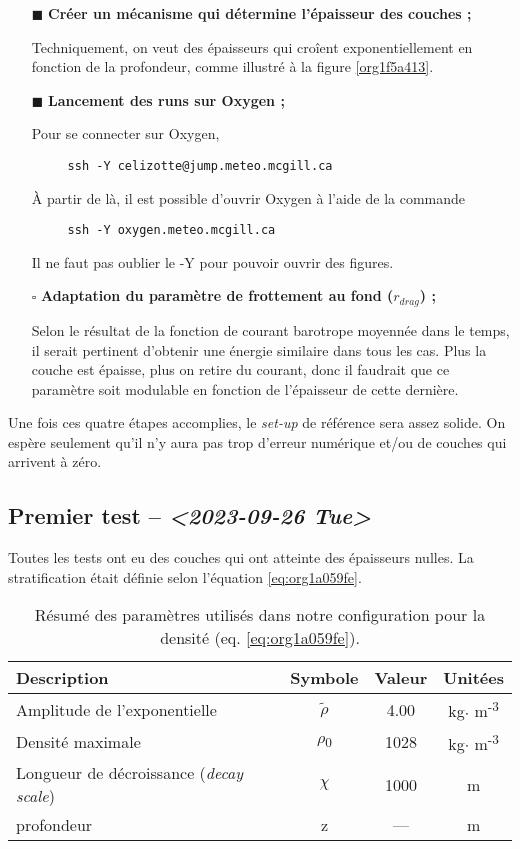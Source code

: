 \documentclass[10pt]{article}
\numberwithin{equation}{section}
\renewcommand{\boxtimes}{\blacksquare}
\begin{document}
\begin{itemize}
\item[{$\boxtimes$}] \textbf{Créer un mécanisme qui détermine l'épaisseur des couches ;}

Techniquement, on veut des épaisseurs qui croîent exponentiellement en fonction de la profondeur, comme illustré à la figure \ref{org1f5a413}.
\end{itemize}


\begin{itemize}
\item[{$\boxtimes$}] \textbf{Lancement des runs sur Oxygen ;}

Pour se connecter sur Oxygen,
\begin{verbatim}
     ssh -Y celizotte@jump.meteo.mcgill.ca
\end{verbatim}
À partir de là, il est possible d'ouvrir Oxygen à l'aide de la commande
\begin{verbatim}
     ssh -Y oxygen.meteo.mcgill.ca
\end{verbatim}
Il ne faut pas oublier le -Y pour pouvoir ouvrir des figures.

\item[{$\square$}] \textbf{Adaptation du paramètre de frottement au fond (\(r_{drag}\)) ;}

Selon le résultat de la fonction de courant barotrope moyennée dans le temps, il serait pertinent d'obtenir une énergie similaire dans tous les cas.
Plus la couche est épaisse, plus on retire du courant, donc il faudrait que ce paramètre soit modulable en fonction de l'épaisseur de cette dernière.
\end{itemize}

Une fois ces quatre étapes accomplies, le \emph{set-up} de référence sera assez solide.
On espère seulement qu'il n'y aura pas trop d'erreur numérique et/ou de couches qui arrivent à zéro.
\subsection{Premier test -- \textit{<2023-09-26 Tue>}}
\label{sec:org741c693}

Toutes les tests ont eu des couches qui ont atteinte des épaisseurs nulles.
La stratification était définie selon l'équation \ref{eq:org1a059fe}.

\begin{table}[htbp]
\caption{\label{tab:org3e7480a}Résumé des paramètres utilisés dans notre configuration pour la densité (eq. \ref{eq:org1a059fe}).}
\centering
\begin{tabular}{lccc}
\hline
\hline
Description & Symbole & Valeur & Unitées\\
\hline
Amplitude de l'exponentielle & \(\tilde{\rho}\) & 4.00 & kg\(\cdot\) m\textsuperscript{-3}\\
Densité maximale & \(\rho\)\textsubscript{0} & 1028 & kg\(\cdot\) m\textsuperscript{-3}\\
Longueur de décroissance (\emph{decay scale}) & \(\chi\) & 1000 & m\\
profondeur & z & --- & m\\
\hline
\end{tabular}
\end{table}
\end{document}
